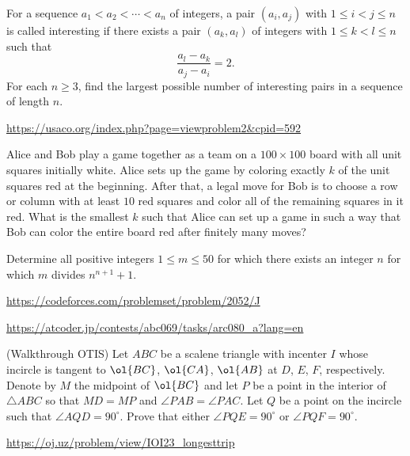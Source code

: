 \documentclass[11pt]{scrartcl}
\begin{document}
\begin{problem}[EGMO 2024/4]
	For a sequence $a_1<a_2<\cdots<a_n$ of integers, a pair $(a_i,a_j)$ with $1\leq i<j\leq n$ is called interesting if there exists a pair $(a_k,a_l)$ of integers with $1\leq k<l\leq n$ such that$$\frac{a_l-a_k}{a_j-a_i}=2.$$For each $n\geq 3$, find the largest possible number of interesting pairs in a sequence of length $n$.
\end{problem}
\begin{problem}
\url{https://usaco.org/index.php?page=viewproblem2&cpid=592}
\end{problem}
\begin{problem}[JBMOSL 2021/C4]
Alice and Bob play a game together as a team on a $100 \times 100$ board with all unit squares initially white. Alice sets up the game by coloring exactly $k$ of the unit squares red at the beginning. After that, a legal move for Bob is to choose a row or column with at least $10$ red squares and color all of the remaining squares in it red. What is the
smallest $k$ such that Alice can set up a game in such a way that Bob can color the entire board red after finitely many moves?
\end{problem}
\begin{problem}
Determine all positive integers $1 \le m \le 50$ for which there exists an integer $n$ for which $m$ divides $n^{n+1}+1$.
\end{problem}
\begin{problem}[CF 2052J]
\url{https://codeforces.com/problemset/problem/2052/J}
\end{problem}
\begin{problem}[AC ARC80A]
\url{https://atcoder.jp/contests/abc069/tasks/arc080_a?lang=en}
\end{problem}
\begin{problem}
  (Walkthrough OTIS)
  Let $ABC$ be a scalene triangle with incenter $I$ whose incircle is
  tangent to $\ol{BC}$, $\ol{CA}$, $\ol{AB}$ at $D$, $E$, $F$,
  respectively.  Denote by $M$ the midpoint of $\ol{BC}$ and
  let $P$ be a point in the interior of $\triangle ABC$
  so that $MD = MP$ and $\angle PAB = \angle PAC$.
  Let $Q$ be a point on the incircle such that $\angle AQD = 90^{\circ}$.
  Prove that either $\angle PQE = 90^{\circ}$ or $\angle PQF = 90^{\circ}$.
\end{problem}
\begin{problem}
\url{https://oj.uz/problem/view/IOI23_longesttrip}
\end{problem}
\end{document}
